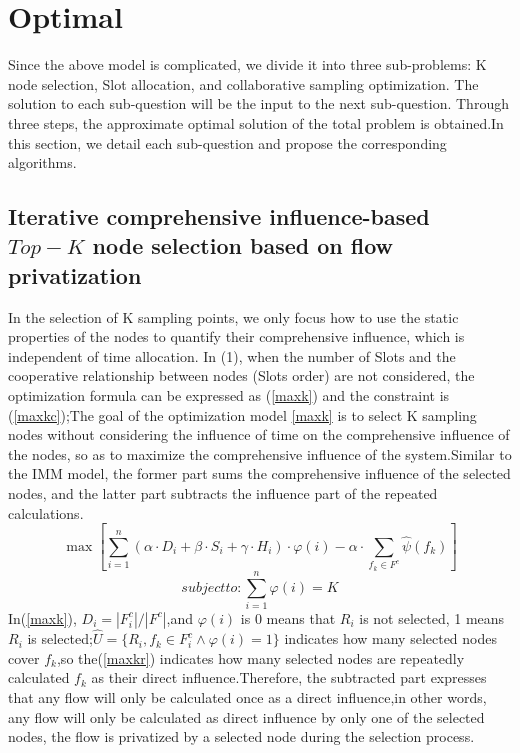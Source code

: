 \documentclass[conference,compsoc]{IEEEtran}
\begin{document}
 



\section{Optimal}
Since the above model is complicated, we divide it into three sub-problems: K node selection, Slot allocation, and collaborative sampling optimization. The solution to each sub-question will be the input to the next sub-question. Through three steps, the approximate optimal solution of the total problem is obtained.In this section, we detail each sub-question and propose the corresponding algorithms.
\subsection{Iterative comprehensive influence-based $Top-K$ node selection based on flow privatization} 
In the selection of K sampling points, we only focus how to use the static properties of the nodes to quantify their comprehensive influence, which is independent of time allocation. In (1), when the number of Slots and the cooperative relationship between nodes (Slots order) are not considered, the optimization formula can be expressed as (\ref{maxk}) and the constraint is (\ref{maxkc});The goal of the optimization model \ref{maxk} is to select K sampling nodes without considering the influence of time on the comprehensive influence of the nodes, so as to maximize the comprehensive influence of the system.Similar to the IMM model, the former part sums the comprehensive influence of the selected nodes, and the latter part subtracts the influence part of the repeated calculations.
\begin{equation}
\max [\sum_{i=1}^n (\alpha \cdot {D_{i}} + \beta \cdot {S_{i}} + \gamma \cdot {H_{i}}) \cdot \varphi{(i)} - \alpha \cdot\sum_{f_k \in F^c} \widehat{\psi}{(f_k)}]
\label{maxk}
\end{equation}
\begin{equation}
subject to:\sum_{i=1}^{n} \varphi(i) = K
\label{maxkc}
\end{equation}
In(\ref{maxk}), $D_i=|F^c_i|/|F^c|$,and $\varphi(i)$ is 0 means that $R_i$ is not selected, 1 means $R_i$ is selected;$\widehat{U} = \{R_i,f_k \in F^c_i \wedge \varphi(i) = 1\}$ indicates how many selected nodes cover $f_k$,so the(\ref{maxkr}) indicates how many selected nodes are repeatedly calculated $f_k$ as their direct influence.Therefore, the subtracted part expresses that any flow will only be calculated once as a direct influence,in other words, any flow will only be calculated as direct influence by only one of the selected nodes, the flow is privatized by a selected node during the selection process.
\end{document}
